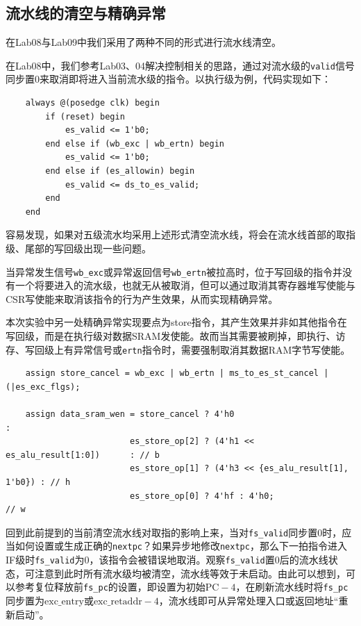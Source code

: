 \documentclass[UTF-8,twoside,cs4size]{ctexart}
\begin{document}
    \subsection{流水线的清空与精确异常}
    在Lab08与Lab09中我们采用了两种不同的形式进行流水线清空。
    
    在Lab08中，我们参考Lab03、04解决控制相关的思路，通过对流水级的\texttt{valid}信号同步置0来取消即将进入当前流水级的指令。以执行级为例，代码实现如下：
    
    \begin{verbatim}
    always @(posedge clk) begin
        if (reset) begin
            es_valid <= 1'b0;
        end else if (wb_exc | wb_ertn) begin
            es_valid <= 1'b0;
        end else if (es_allowin) begin
            es_valid <= ds_to_es_valid;
        end
    end
    \end{verbatim}
    
    容易发现，如果对五级流水均采用上述形式清空流水线，将会在流水线首部的取指级、尾部的写回级出现一些问题。
    
    当异常发生信号\texttt{wb\_exc}或异常返回信号\texttt{wb\_ertn}被拉高时，位于写回级的指令并没有一个将要进入的流水级，也就无从被取消，但可以通过取消其寄存器堆写使能与CSR写使能来取消该指令的行为产生效果，从而实现精确异常。
    
    本次实验中另一处精确异常实现要点为store指令，其产生效果并非如其他指令在写回级，而是在执行级对数据SRAM发使能。故而当其需要被刷掉，即执行、访存、写回级上有异常信号或\texttt{ertn}指令时，需要强制取消其数据RAM字节写使能。
    
    \begin{verbatim}
    assign store_cancel = wb_exc | wb_ertn | ms_to_es_st_cancel | (|es_exc_flgs);
    
    assign data_sram_wen = store_cancel ? 4'h0                               :
                         es_store_op[2] ? (4'h1 <<  es_alu_result[1:0])      : // b
                         es_store_op[1] ? (4'h3 << {es_alu_result[1], 1'b0}) : // h
                         es_store_op[0] ? 4'hf : 4'h0;                         // w
    \end{verbatim}
    
    回到此前提到的当前清空流水线对取指的影响上来，当对\texttt{fs\_valid}同步置0时，应当如何设置或生成正确的\texttt{nextpc}？如果异步地修改\texttt{nextpc}，那么下一拍指令进入IF级时\texttt{fs\_valid}为0，该指令会被错误地取消。观察\texttt{fs\_valid}置0后的流水线状态，可注意到此时所有流水级均被清空，流水线等效于未启动。由此可以想到，可以参考复位释放前\texttt{fs\_pc}的设置，即设置为$ \text{初始PC}-4 $，在刷新流水线时将\texttt{fs\_pc}同步置为$ \mathrm{exc\_entry}\text{或}\mathrm{exc\_retaddr}-4 $，流水线即可从异常处理入口或返回地址“重新启动”。
    
\end{document}
